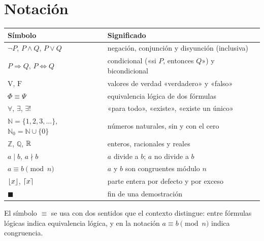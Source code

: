 \documentclass[11pt,a4paper,twoside,openany]{book}
\newcommand{\N}{\mathbb{N}}
\newcommand{\Z}{\mathbb{Z}}
\newcommand{\Q}{\mathbb{Q}}
\renewcommand{\V}{\mathrm{V}}%
\newcommand{\F}{\mathrm{F}}
\newcommand{\divides}{\mid}
\newcommand{\nodivide}{\nmid}
\newcommand{\eqlog}{\equiv}
\DeclarePairedDelimiter{\floor}{\lfloor}{\rfloor}
\DeclarePairedDelimiter{\ceil}{\lceil}{\rceil}
\begin{document}
\section*{Notación}
\begin{center}
\begin{tabular}{@{}ll@{}}
\toprule
Símbolo & Significado \\
\midrule
$\neg P$, $P\wedge Q$, $P\vee Q$ & negación, conjunción y disyunción (inclusiva) \\
$P\Rightarrow Q$, $P\Leftrightarrow Q$ & condicional («si $P$, entonces $Q$») y bicondicional \\
$\V$, $\F$ & valores de verdad «verdadero» y «falso» \\
$\Phi\eqlog\Psi$ & equivalencia lógica de dos fórmulas \\
$\forall$, $\exists$, $\exists!$ & «para todo», «existe», «existe un único» \\
$\N=\{1,2,3,\dots\}$, $\N_0=\N\cup\{0\}$ & números naturales, sin y con el cero \\
$\Z$, $\Q$, $\mathbb{R}$ & enteros, racionales y reales \\
$a\divides b$, $a\nodivide b$ & $a$ divide a $b$; $a$ no divide a $b$ \\
$a\equiv b\pmod n$ & $a$ y $b$ son congruentes módulo $n$ \\
$\floor{x}$, $\ceil{x}$ & parte entera por defecto y por exceso \\
$\blacksquare$ & fin de una demostración \\
\bottomrule
\end{tabular}
\end{center}
El símbolo $\equiv$ se usa con dos sentidos que el contexto distingue: entre fórmulas lógicas indica equivalencia lógica, y en la notación $a\equiv b\pmod n$ indica congruencia.


\tableofcontents

\mainmatter







\backmatter

\end{document}
